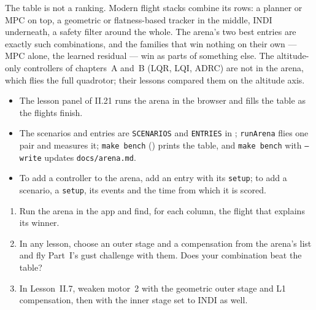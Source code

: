 The table is not a ranking. Modern flight stacks combine its rows: a planner or MPC on top, a geometric or flatness-based tracker in the middle, INDI underneath, a safety filter around the whole. The arena's two best entries are exactly such combinations, and the families that win nothing on their own — MPC alone, the learned residual — win as parts of something else. The altitude-only controllers of chapters~A and~B (LQR, LQI, ADRC) are not in the arena, which flies the full quadrotor; their lessons compared them on the altitude axis.

\begin{inapp}
\begin{itemize}[leftmargin=1.2em]
  \item The lesson panel of II.21 runs the arena in the browser and fills the table as the flights finish.
  \item The scenarios and entries are \texttt{SCENARIOS} and \texttt{ENTRIES} in ; \texttt{runArena} flies one pair and measures it; \texttt{make bench} () prints the table, and \texttt{make bench} with \texttt{--write} updates \texttt{docs/arena.md}.
  \item To add a controller to the arena, add an entry with its \texttt{setup}; to add a scenario, a \texttt{setup}, its events and the time from which it is scored.
\end{itemize}
\end{inapp}

\begin{trythis}
\begin{enumerate}
  \item Run the arena in the app and find, for each column, the flight that explains its winner.
  \item In any lesson, choose an outer stage and a compensation from the arena's list and fly Part~I's gust challenge with them. Does your combination beat the table?
  \item In Lesson~II.7, weaken motor~2 with the geometric outer stage and L1 compensation, then with the inner stage set to INDI as well.
\end{enumerate}
\end{trythis}

